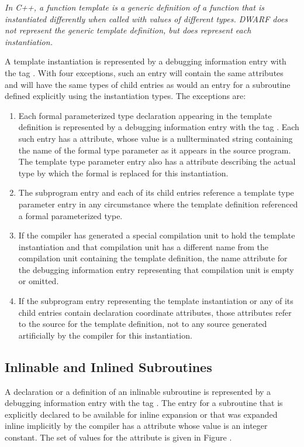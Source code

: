 \textit{In C++, a function template is a generic definition of
a function that is instantiated differently when called with
values of different types. DWARF does not represent the generic
template definition, but does represent each instantiation.}

A template instantiation is represented by a debugging
information entry with the tag . With four
exceptions, such an entry will contain the same attributes and
will have the same types of child entries as would an entry
for a subroutine defined explicitly using the instantiation
types. The exceptions are:

\begin{enumerate}[1.]
\item Each formal parameterized type declaration appearing in the
template definition is represented by a debugging information
entry with the 
tag . 
Each
such entry has a  attribute, whose value is a
null\dash terminated string containing the name of the formal
type parameter as it appears in the source program. The
template type parameter entry also has a  attribute
describing the actual type by which the formal is replaced
for this instantiation.

\item The subprogram entry and each of its child entries reference
a template type parameter entry in any circumstance where
the template definition referenced a formal parameterized type.

\item If the compiler has generated a special compilation unit
to hold the template instantiation and that compilation unit
has a different name from the compilation unit containing
the template definition, the name attribute for the debugging
information entry representing that compilation unit is empty
or omitted.

\item If the subprogram entry representing the template
instantiation or any of its child entries contain declaration
coordinate attributes, those attributes refer to the source
for the template definition, not to any source generated
artificially by the compiler for this instantiation.
\end{enumerate}



\subsection{Inlinable and Inlined Subroutines}
A declaration or a definition of an inlinable subroutine
is represented by a debugging information entry with the
tag . The entry for a subroutine that is
explicitly declared to be available for inline expansion or
that was expanded inline implicitly by the compiler has a
 attribute whose value is an integer constant. The
set of values for the  attribute is given in
Figure .

